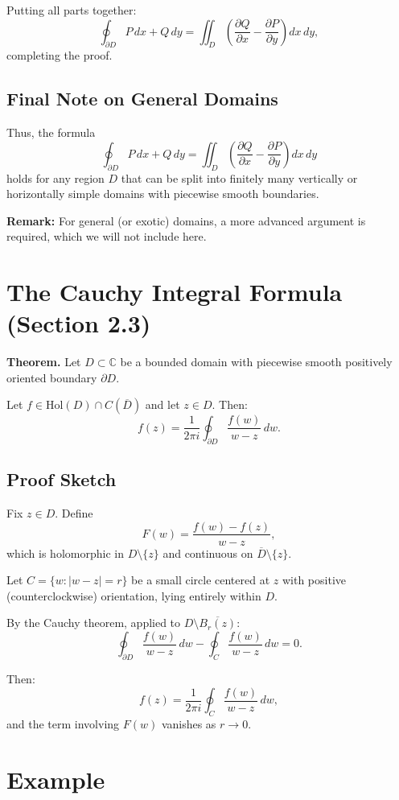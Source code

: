 \documentclass[12pt]{article}
\theoremstyle{definition} %
\theoremstyle{plain} %
\begin{document}
Putting all parts together:
\[
\oint_{\partial D} P\,dx + Q\,dy = \iint_D \left( \frac{\partial Q}{\partial x} - \frac{\partial P}{\partial y} \right) dx\,dy,
\]
completing the proof.

\subsection*{Final Note on General Domains}

Thus, the formula
\[
\oint_{\partial D} P\,dx + Q\,dy = \iint_D \left( \frac{\partial Q}{\partial x} - \frac{\partial P}{\partial y} \right) dx\,dy
\]
holds for any region $D$ that can be split into finitely many vertically or horizontally simple domains with piecewise smooth boundaries.

\textbf{Remark:} For general (or exotic) domains, a more advanced argument is required, which we will not include here.
\section*{The Cauchy Integral Formula (Section 2.3)}

\textbf{Theorem.} Let $D \subset \mathbb{C}$ be a bounded domain with piecewise smooth positively oriented boundary $\partial D$.

Let $f \in \text{Hol}(D) \cap C(\overline{D})$ and let $z \in D$. Then:
\[
f(z) = \frac{1}{2\pi i} \oint_{\partial D} \frac{f(w)}{w - z} \, dw.
\]

\subsection*{Proof Sketch}

Fix $z \in D$. Define
\[
F(w) = \frac{f(w) - f(z)}{w - z},
\]
which is holomorphic in $D \setminus \{z\}$ and continuous on $\overline{D} \setminus \{z\}$.

Let $C = \{ w : |w - z| = r \}$ be a small circle centered at $z$ with positive (counterclockwise) orientation, lying entirely within $D$.

By the Cauchy theorem, applied to $D \setminus \overline{B_r(z)}$:
\[
\oint_{\partial D} \frac{f(w)}{w - z} \, dw - \oint_{C} \frac{f(w)}{w - z} \, dw = 0.
\]

Then:
\[
f(z) = \frac{1}{2\pi i} \oint_{C} \frac{f(w)}{w - z} \, dw,
\]
and the term involving $F(w)$ vanishes as $r \to 0$.

\section*{Example}
\end{document}
